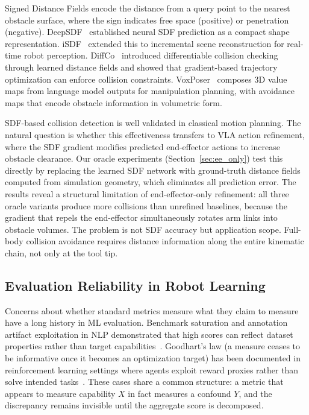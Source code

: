 Signed Distance Fields encode the distance from a query point to the nearest obstacle surface, where the sign indicates free space (positive) or penetration (negative). DeepSDF~\cite{park2019deepsdf} established neural SDF prediction as a compact shape representation. iSDF~\cite{ortiz2022isdf} extended this to incremental scene reconstruction for real-time robot perception. DiffCo~\cite{zhi2021diffco} introduced differentiable collision checking through learned distance fields and showed that gradient-based trajectory optimization can enforce collision constraints. VoxPoser~\cite{huang2023voxposer} composes 3D value maps from language model outputs for manipulation planning, with avoidance maps that encode obstacle information in volumetric form.

SDF-based collision detection is well validated in classical motion planning. The natural question is whether this effectiveness transfers to VLA action refinement, where the SDF gradient modifies predicted end-effector actions to increase obstacle clearance. Our oracle experiments (Section~\ref{sec:ee_only}) test this directly by replacing the learned SDF network with ground-truth distance fields computed from simulation geometry, which eliminates all prediction error. The results reveal a structural limitation of end-effector-only refinement: all three oracle variants produce more collisions than unrefined baselines, because the gradient that repels the end-effector simultaneously rotates arm links into obstacle volumes. The problem is not SDF accuracy but application scope. Full-body collision avoidance requires distance information along the entire kinematic chain, not only at the tool tip.

\subsection{Evaluation Reliability in Robot Learning}\label{sec:rw_eval}

Concerns about whether standard metrics measure what they claim to measure have a long history in ML evaluation. Benchmark saturation and annotation artifact exploitation in NLP demonstrated that high scores can reflect dataset properties rather than target capabilities~\cite{gururangan2018annotation}. Goodhart's law (a measure ceases to be informative once it becomes an optimization target) has been documented in reinforcement learning settings where agents exploit reward proxies rather than solve intended tasks~\cite{karwowski2024goodhart}. These cases share a common structure: a metric that appears to measure capability $X$ in fact measures a confound $Y$, and the discrepancy remains invisible until the aggregate score is decomposed.

